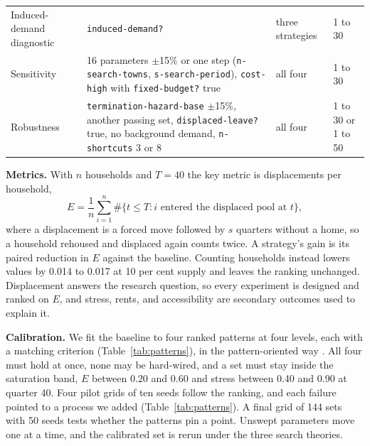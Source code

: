 \documentclass[10pt,a4paper]{article}
\begin{document}
\begin{table}[tp]
\begin{tabular}{L{3.0cm}L{7.3cm}L{2.5cm}L{1.4cm}}
Induced-demand diagnostic & \texttt{induced-demand?} & three strategies & 1 to 30 \\
Sensitivity & 16 parameters $\pm$15\% or one step (\texttt{n-search-towns}, \texttt{s-search-period}), \texttt{cost-high} with \texttt{fixed-budget?} true & all four & 1 to 30 \\
Robustness & \texttt{termination-hazard-base} $\pm$15\%, another passing set, \texttt{displaced-leave?} true, no background demand, \texttt{n-shortcuts} 3 or 8 & all four & 1 to 30 or 1 to 50 \\
\bottomrule
\end{tabular}
\end{table}

\textbf{Metrics.} With $n$ households and $T=40$ the key metric is displacements per household,
\begin{equation}
E=\frac{1}{n}\sum_{i=1}^{n}\#\{t\le T : i \text{ entered the displaced pool at } t\},
\end{equation}
where a displacement is a forced move \citep{11} followed by $s$ quarters without a home, so a household rehoused and displaced again counts twice. A strategy's gain is its paired reduction in $E$ against the baseline. Counting households instead lowers values by 0.014 to 0.017 at 10 per cent supply and leaves the ranking unchanged. Displacement answers the research question, so every experiment is designed and ranked on $E$, and stress, rents, and accessibility are secondary outcomes used to explain it.

\textbf{Calibration.} We fit the baseline to four ranked patterns at four levels, each with a matching criterion (Table~\ref{tab:patterns}), in the pattern-oriented way \citep{27,28}. All four must hold at once, none may be hard-wired, and a set must stay inside the saturation band, $E$ between 0.20 and 0.60 and stress between 0.40 and 0.90 at quarter 40. Four pilot grids of ten seeds follow the ranking, and each failure pointed to a process we added (Table~\ref{tab:patterns}). A final grid of 144 sets with 50 seeds tests whether the patterns pin a point. Unswept parameters move one at a time, and the calibrated set is rerun under the three search theories.
\end{document}
